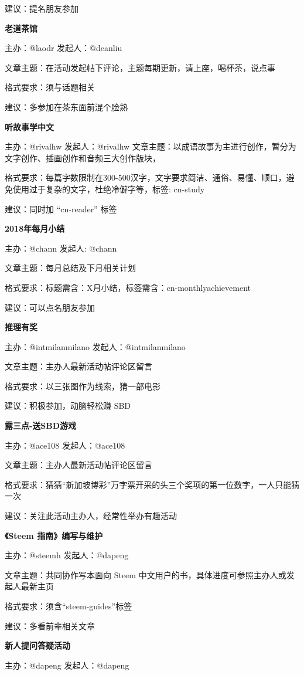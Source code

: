 \documentclass[]{ctexbook}
\begin{document}
建议：提名朋友参加

\textbf{老道茶馆}

主办：@laodr 发起人：@deanliu

文章主题：在活动发起帖下评论，主题每期更新，请上座，喝杯茶，说点事

格式要求：须与话题相关

建议：多参加在茶东面前混个脸熟

\textbf{听故事学中文}

主办：@rivalhw 发起人：@rivalhw
文章主题：以成语故事为主进行创作，暂分为文字创作、插画创作和音频三大创作版块，

格式要求：每篇字数限制在300-500汉字，文字要求简洁、通俗、易懂、顺口，避免使用过于复杂的文字，杜绝冷僻字等，标签: cn-study

建议：同时加 ``cn-reader'' 标签

\textbf{2018年每月小结}

主办：@chann 发起人: @chann

文章主题：每月总结及下月相关计划

格式要求：标题需含：X月小结，标签需含：cn-monthlyachievement

建议：可以点名朋友参加

\textbf{推理有奖}

主办：@intmilanmilano 发起人：@intmilanmilano

文章主题：主办人最新活动帖评论区留言

格式要求：以三张图作为线索，猜一部电影

建议：积极参加，动脑轻松赚 SBD

\textbf{露三点-送SBD游戏}

主办：@ace108 发起人：@ace108

文章主题：主办人最新活动帖评论区留言

格式要求：猜猜``新加坡博彩''万字票开采的头三个奖项的第一位数字，一人只能猜一次

建议：关注此活动主办人，经常性举办有趣活动

\textbf{《Steem 指南》编写与维护}

主办：@steemh 发起人：@dapeng

文章主题：共同协作写本面向 Steem 中文用户的书，具体进度可参照主办人或发起人最新主页

格式要求：须含``steem-guides''标签

建议：多看前辈相关文章

\textbf{新人提问答疑活动}

主办：@dapeng 发起人：@dapeng
\end{document}
